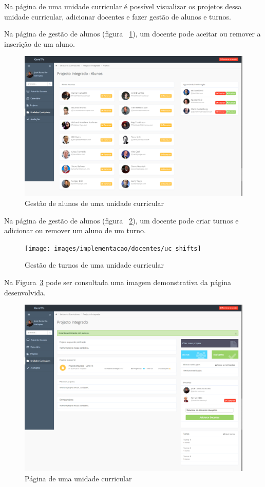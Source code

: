 Na página de uma unidade curricular é possível visualizar os projetos dessa unidade curricular, adicionar docentes e fazer gestão de alunos e turnos.

Na página de gestão de alunos (figura ~\ref{fig:uc_students}), um docente pode aceitar ou remover a inscrição de um aluno.

\begin{figure}[H]
  \centering
  \includegraphics[width=1\textwidth,center]{images/implementacao/docentes/uc_students}
  \caption{Gestão de alunos de uma unidade curricular}
  \label{fig:uc_students}
\end{figure}


Na página de gestão de alunos (figura ~\ref{fig:uc_shifts}), um docente pode criar turnos e adicionar ou remover um aluno de um turno.

\begin{figure}[H]
  \centering
  \texttt{[image: images/implementacao/docentes/uc\_shifts]}
  \caption{Gestão de turnos de uma unidade curricular}
  \label{fig:uc_shifts}
\end{figure}


Na Figura~\ref{fig:teacher_subjects} pode ser consultada uma imagem demonstrativa da página desenvolvida.

\begin{figure}[H]
  \centering
  \includegraphics[width=1\textwidth,center]{images/implementacao/docentes/uc}
  \caption{Página de uma unidade curricular}
  \label{fig:teacher_subjects}
\end{figure}
